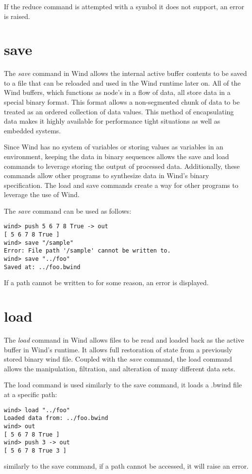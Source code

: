\par If the reduce command is attempted with a symbol it does not support, an error is raised.

\section{save}

\paragraph{  } The \emph{save} command in Wind allows the internal active buffer contents to be saved to a file that can be reloaded and used in the Wind runtime later on. All of the Wind buffers, which functions as node's in a flow of data, all store data in a special binary format. This format allows a non-segmented chunk of data to be treated as an ordered collection of data values. This method of encapsulating data makes it highly available for performance tight situations as well as embedded systems.
\par Since Wind has no system of variables or storing values as variables in an environment, keeping the data in binary sequences allows the save and load commands to leverage storing the output of processed data. Additionally, these commands allow other programs to synthesize data in Wind's binary specification. The load and save commands create a way for other programs to leverage the use of Wind.
\par The \emph{save} command can be used as follows: \\

\begin{verbatim}
wind> push 5 6 7 8 True -> out
[ 5 6 7 8 True ]
wind> save "/sample"
Error: File path '/sample' cannot be written to.
wind> save "../foo"
Saved at: ../foo.bwind
\end{verbatim}

\par If a path cannot be written to for some reason, an error is displayed.

\section{load}

\paragraph{  } The \emph{load} command in Wind allows  files to be read and loaded back as the active buffer in Wind's runtime. It allows full restoration of state from a previously stored binary wind file. Coupled with the \emph{save} command, the load command allows the manipulation, filtration, and alteration of many different data sets. 
\par The load command is used similarly to the save command, it loads a .bwind file at a specific path:

\begin{verbatim}
wind> load "../foo"
Loaded data from: ../foo.bwind
wind> out
[ 5 6 7 8 True ]
wind> push 3 -> out
[ 5 6 7 8 True 3 ]
\end{verbatim}

\par similarly to the save command, if a path cannot be accessed, it will raise an error.
